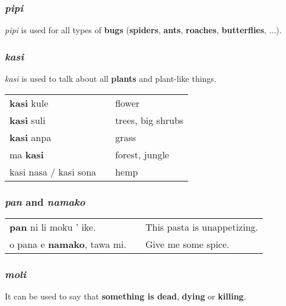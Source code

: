 \subsubsection*{\textit{pipi}}
%
\textit{pipi} is used for all types of \textbf{bugs} (\textbf{spiders}, \textbf{ants}, \textbf{roaches}, \textbf{butterflies}, ...). 
%
\newpage
{}
\subsubsection*{\textit{kasi}}
%
\textit{kasi} is used to talk about all \textbf{plants} and plant-like things. 

\begin{supertabular}{p{5,5cm}|ll}
\textbf{kasi} kule && flower \\
\textbf{kasi} suli && trees, big shrubs \\
\textbf{kasi} anpa && grass \\
ma \textbf{kasi} && forest, jungle \\
kasi nasa / kasi sona && hemp  \\
\end{supertabular} 
%
\subsubsection*{\textit{pan} and \textit{namako}}
\begin{supertabular}{p{5,5cm}|ll}
\textbf{pan} ni li moku ' ike. && This pasta is unappetizing. \\
o pana e \textbf{namako}, tawa mi. &&   Give me some spice. \\
\end{supertabular} 
%
\subsubsection*{\textit{moli}}
%
It can be used to say that \textbf{something is dead}, \textbf{dying} or \textbf{killing}.

